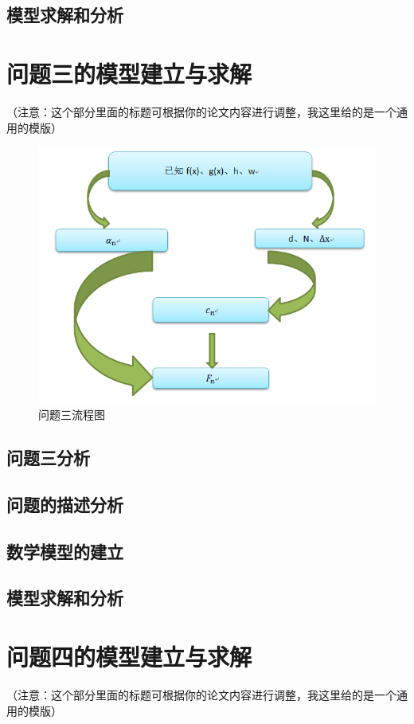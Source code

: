 \documentclass[a4paper,10pt]{my_paper}
\numberwithin{equation}{section}
\begin{document}
\subsection{模型求解和分析}


\section{问题三的模型建立与求解}
（注意：这个部分里面的标题可根据你的论文内容进行调整，我这里给的是一个通用的模版）
\begin{figure}[!h]
    \centering
    \includegraphics[width=.7\textwidth]{1.png}
    \caption{问题三流程图}
\end{figure}

\subsection{问题三分析}

\subsection{问题的描述分析}

\subsection{数学模型的建立}

\subsection{模型求解和分析}

\section{问题四的模型建立与求解}
（注意：这个部分里面的标题可根据你的论文内容进行调整，我这里给的是一个通用的模版）
\end{document}
